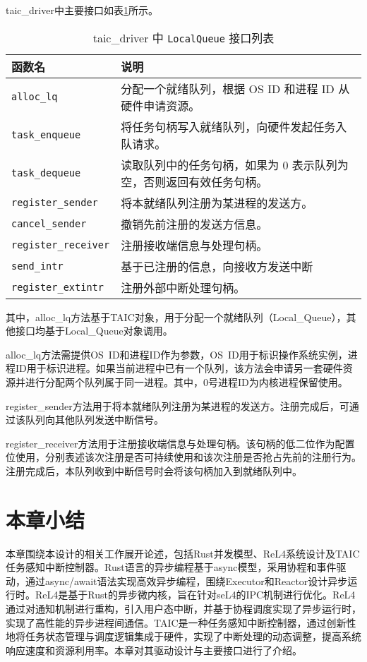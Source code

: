 taic\_driver中主要接口如表\ref{tab:taicdriver}所示。

\begin{table}[htbp]
\centering
\begin{tabular}{|l|p{10cm}|}
\hline
\textbf{函数名} & \textbf{说明} \\
\hline
\texttt{alloc\_lq} & 分配一个就绪队列，根据 OS ID 和进程 ID 从硬件申请资源。 \\
\hline
\texttt{task\_enqueue} & 将任务句柄写入就绪队列，向硬件发起任务入队请求。 \\
\hline
\texttt{task\_dequeue} & 读取队列中的任务句柄，如果为 0 表示队列为空，否则返回有效任务句柄。 \\
\hline
\texttt{register\_sender} & 将本就绪队列注册为某进程的发送方。 \\
\hline
\texttt{cancel\_sender} & 撤销先前注册的发送方信息。 \\
\hline
\texttt{register\_receiver} & 注册接收端信息与处理句柄。 \\
\hline
\texttt{send\_intr} & 基于已注册的信息，向接收方发送中断 \\
\hline
\texttt{register\_extintr} & 注册外部中断处理句柄。 \\
\hline
\end{tabular}
\caption{taic\_driver 中 \texttt{LocalQueue} 接口列表}


\label{tab:taicdriver}
\end{table}

其中，alloc\_lq方法基于TAIC对象，用于分配一个就绪队列（Local\_Queue），其他接口均基于Local\_Queue对象调用。

alloc\_lq方法需提供OS\ ID和进程ID作为参数，OS\ ID用于标识操作系统实例，进程ID用于标识进程。如果当前进程中已有一个队列，该方法会申请另一套硬件资源并进行分配两个队列属于同一进程。其中，0号进程ID为内核进程保留使用。

register\_sender方法用于将本就绪队列注册为某进程的发送方。注册完成后，可通过该队列向其他队列发送中断信号。

register\_receiver方法用于注册接收端信息与处理句柄。该句柄的低二位作为配置位使用，分别表述该次注册是否可持续使用和该次注册是否抢占先前的注册行为。注册完成后，本队列收到中断信号时会将该句柄加入到就绪队列中。






\section{本章小结}

本章围绕本设计的相关工作展开论述，包括Rust并发模型、ReL4系统设计及TAIC任务感知中断控制器。Rust语言的异步编程基于async模型，采用协程和事件驱动，通过async/await语法实现高效异步编程，围绕Executor和Reactor设计异步运行时。ReL4是基于Rust的异步微内核，旨在针对seL4的IPC机制进行优化。ReL4通过对通知机制进行重构，引入用户态中断，并基于协程调度实现了异步运行时，实现了高性能的异步进程间通信。TAIC是一种任务感知中断控制器，通过创新性地将任务状态管理与调度逻辑集成于硬件，实现了中断处理的动态调整，提高系统响应速度和资源利用率。本章对其驱动设计与主要接口进行了介绍。